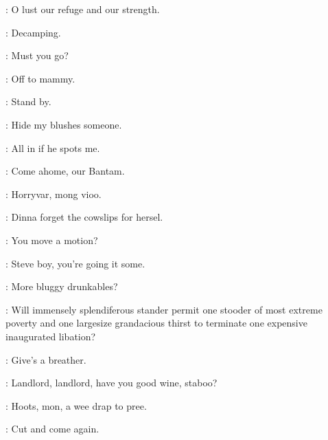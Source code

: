 \documentclass[12pt]{article}
\begin{document}



\Ly: O lust our refuge and our strength.

\Md: Decamping.

\Ba: Must you go?

\Md: Off to mammy.

\Dx: Stand by.

\Md: Hide my blushes someone.


\Bl: All in if he spots me.

\PC: Come ahome, our Bantam.

\Dx: Horryvar, mong vioo.

\Cr: Dinna forget the cowslips for hersel.














\SD: You move a motion?

\Ln: Steve boy, you're going it some.

\Dx: More bluggy drunkables?

\Ly: Will immensely splendiferous stander permit one stooder of
most extreme poverty and one largesize grandacious thirst to terminate
one expensive inaugurated libation?

\Cr: Give's a breather.

\PC: Landlord, landlord, have you good wine, staboo?

\Cr: Hoots, mon, a wee drap to pree.

\Ln: Cut and come again.
\end{document}

